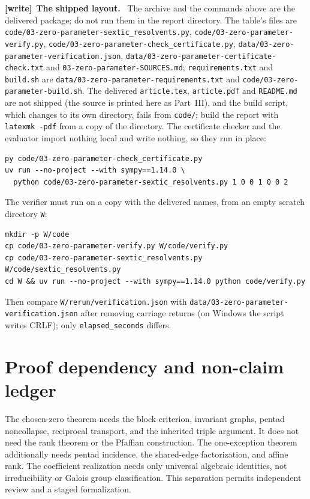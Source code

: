 \documentclass[11pt,letterpaper]{article}
\numberwithin{equation}{section}
\theoremstyle{definition}
\theoremstyle{remark}
\newcommand{\src}[1]{\texttt{\nolinkurl{#1}}}
\newenvironment{writenote}[1][]{\par\smallskip\begingroup\small
 \noindent\textbf{[write]}\if\relax\detokenize{#1}\relax\else~\textbf{#1.}\fi\ }%
 {\par\endgroup\smallskip}
\begin{document}
\begin{writenote}[The shipped layout]
The archive and the commands above are the delivered package; do not run
them in the report directory. The table's files are
\src{code/03-zero-parameter-sextic_resolvents.py},
\src{code/03-zero-parameter-verify.py},
\src{code/03-zero-parameter-check_certificate.py},
\src{data/03-zero-parameter-verification.json},
\src{data/03-zero-parameter-certificate-check.txt} and
\src{03-zero-parameter-SOURCES.md}; \src{requirements.txt} and
\src{build.sh} are \src{data/03-zero-parameter-requirements.txt} and
\src{code/03-zero-parameter-build.sh}. The delivered \src{article.tex},
\src{article.pdf} and \src{README.md} are not shipped (the source is
printed here as Part~III), and the build script, which changes to its own
directory, fails from \src{code/}; build the report with \src{latexmk -pdf}
from a copy of the directory. The certificate checker and the evaluator
import nothing local and write nothing, so they run in place:
\begin{verbatim}
py code/03-zero-parameter-check_certificate.py
uv run --no-project --with sympy==1.14.0 \
  python code/03-zero-parameter-sextic_resolvents.py 1 0 0 1 0 0 2
\end{verbatim}
The verifier must run on a copy with the delivered names, from an empty
scratch directory \src{W}:
\begin{verbatim}
mkdir -p W/code
cp code/03-zero-parameter-verify.py W/code/verify.py
cp code/03-zero-parameter-sextic_resolvents.py W/code/sextic_resolvents.py
cd W && uv run --no-project --with sympy==1.14.0 python code/verify.py
\end{verbatim}
Then compare \src{W/rerun/verification.json} with
\src{data/03-zero-parameter-verification.json} after removing carriage
returns (on Windows the script writes CRLF); only \src{elapsed_seconds}
differs.
\end{writenote}

\section{Proof dependency and non-claim ledger}
\label{zpt:app:ledger}
The chosen-zero theorem needs the block criterion, invariant graphs,
pentad noncollapse, reciprocal transport, and the inherited triple
argument. It does not need the rank theorem or the Pfaffian construction.
The one-exception theorem additionally needs pentad incidence, the
shared-edge factorization, and affine rank. The coefficient realization
needs only universal algebraic identities, not irreducibility or Galois
group classification. This separation permits independent review and a
staged formalization.
\end{document}
